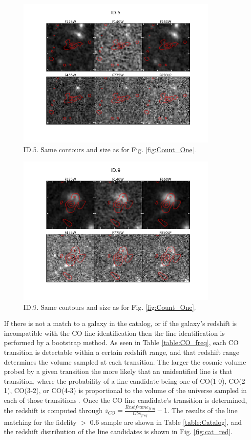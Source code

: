 \begin{figure}[!htbp]
\centering \includegraphics[width=100mm]{Matched/ASPECS_Cutout_4.png}
\caption{ID.5. Same contours and size as for Fig. \ref{fig:Count_One}. }
\label{fig:Count_Five}
\end{figure}

\begin{figure}[!htbp]
\centering \includegraphics[width=100mm]{Matched/ASPECS_Cutout_8.png}
\caption{ID.9. Same contours and size as for Fig. \ref{fig:Count_One}.}
\label{fig:Count_Nine}
\end{figure}

If there is not a match to a galaxy in the catalog, or if the galaxy's redshift is incompatible with the CO line identification then the line identification is performed by a bootstrap method. As seen in Table \ref{table:CO_freq}, each CO transition is detectable within a certain redshift range, and that redshift range determines the volume sampled at each transition. The larger the cosmic volume probed by a given transition the more likely that an unidentified line is that transition, where the probability of a line candidate being one of CO(1-0), CO(2-1), CO(3-2), or CO(4-3) is proportional to the volume of the universe sampled in each of those transitions \cite{walter2016alma, decarli2019alma}. Once the CO line candidate's transition is determined, the redshift is computed through $ z_{CO} = \frac{Restframe_{freq}}{Obs_{freq}} - 1 $. The results of the line matching for the fidelity $>$ 0.6 sample are shown in Table \ref{table:Catalog}, and the redshift distribution of the line candidates is shown in Fig. \ref{fig:cat_red}.

